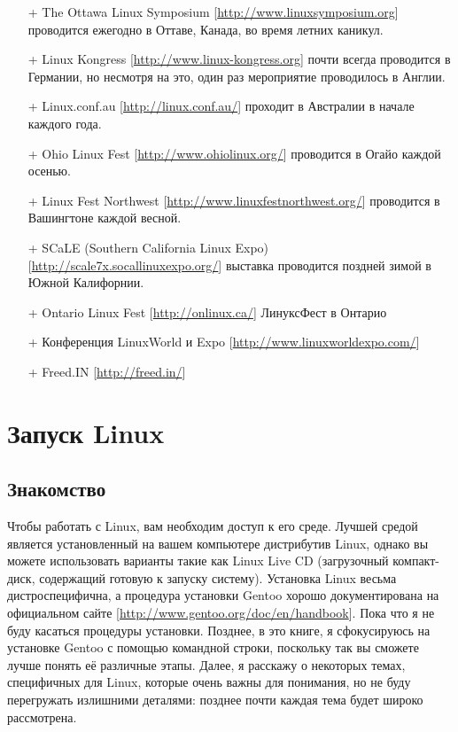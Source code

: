\documentclass[12pt]{book}
\begin{document}
\phantom{}
\begin{tcolorbox}[title=\textbf{Дальнейшие ресурсы}, colback=yellow!14!white, colframe=red!75!blue]
\begin{itemize}
	\item[+] The Ottawa Linux Symposium [\href{http://www.linuxsymposium.org}{http://www.linuxsymposium.org}] проводится ежегодно в Оттаве, Канада, во время летних каникул.
	\item[+] Linux Kongress [\href{http://www.linux-kongress.org}{http://www.linux-kongress.org}] почти всегда проводится в Германии, но несмотря на это, один раз мероприятие проводилось в Англии.
	\item[+] Linux.conf.au [\href{http://linux.conf.au/}{http://linux.conf.au/}] проходит в Австралии в начале каждого года.
	\item[+] Ohio Linux Fest [\href{http://www.ohiolinux.org/}{http://www.ohiolinux.org/}] проводится в Огайо каждой осенью.
	\item[+] Linux Fest Northwest [\href{http://www.linuxfestnorthwest.org/}{http://www.linuxfestnorthwest.org/}] проводится в Вашингтоне каждой весной.
	\item[+] SCaLE (Southern California Linux Expo) [\href{http://scale7x.socallinuxexpo.org/}{http://scale7x.socallinuxexpo.org/}] выставка проводится поздней зимой в Южной Калифорнии.
	\item[+] Ontario Linux Fest [\href{http://onlinux.ca/}{http://onlinux.ca/}] ЛинуксФест в Онтарио
	\item[+] Конференция LinuxWorld и Expo [\href{http://www.linuxworldexpo.com/}{http://www.linuxworldexpo.com/}]
	\item[+] Freed.IN [\href{http://freed.in/}{http://freed.in/}]
\end{itemize}
\end{tcolorbox}

\newpage


\chapter{Запуск Linux}

\section*{Знакомство}

Чтобы работать с Linux, вам необходим доступ к его среде. Лучшей средой является установленный на вашем компьютере дистрибутив Linux, однако вы можете использовать варианты такие как Linux Live CD (загрузочный компакт-диск, содержащий готовую к запуску систему). Установка Linux весьма дистроспецифична, а процедура установки Gentoo хорошо документирована на официальном сайте [\href{http://www.gentoo.org/doc/en/handbook}{http://www.gentoo.org/doc/en/handbook}]. Пока что я не буду касаться процедуры установки. Позднее, в это книге, я сфокусируюсь на установке Gentoo с помощью командной строки, поскольку так вы сможете лучше понять её различные этапы. Далее, я расскажу о некоторых темах, специфичных для Linux, которые очень важны для понимания, но не буду перегружать излишними деталями: позднее почти каждая тема будет широко рассмотрена.
\end{document}
